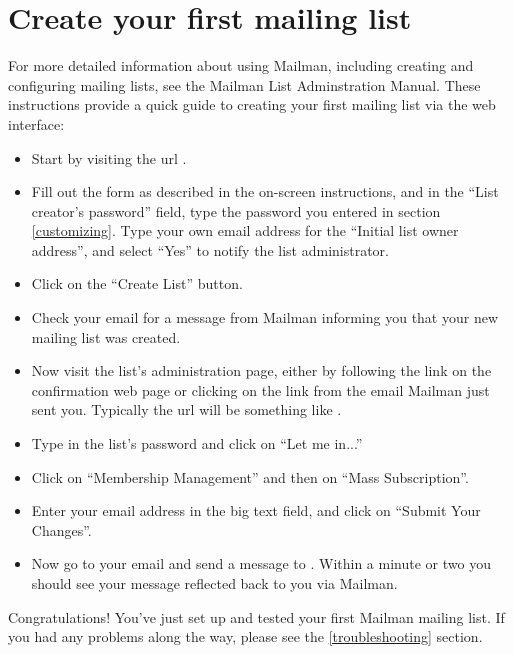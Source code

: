\documentclass{howto}
\begin{document}
\section{Create your first mailing list}

For more detailed information about using Mailman, including creating and
configuring mailing lists, see the Mailman List Adminstration Manual.  These
instructions provide a quick guide to creating your first mailing list via the
web interface:

\begin{itemize}
\item Start by visiting the url .

\item Fill out the form as described in the on-screen instructions, and in the
      ``List creator's password'' field, type the password you entered in
      section \ref{customizing}.  Type your own email address for the
      ``Initial list owner address'', and select ``Yes'' to notify the list
      administrator.

\item Click on the ``Create List'' button.

\item Check your email for a message from Mailman informing you that your new
      mailing list was created.

\item Now visit the list's administration page, either by following the link
      on the confirmation web page or clicking on the link from the email
      Mailman just sent you.  Typically the url will be something like
      .

\item Type in the list's password and click on ``Let me in...''

\item Click on ``Membership Management'' and then on ``Mass Subscription''.

\item Enter your email address in the big text field, and click on ``Submit
      Your Changes''.

\item Now go to your email and send a message to .
      Within a minute or two you should see your message reflected back to you
      via Mailman.
\end{itemize}

Congratulations!  You've just set up and tested your first Mailman mailing
list.  If you had any problems along the way, please see the
\ref{troubleshooting} section.
\end{document}
